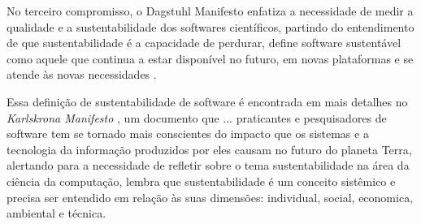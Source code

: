 
No terceiro compromisso, o Dagstuhl Manifesto enfatiza a necessidade de medir a
qualidade e a sustentabilidade dos softwares científicos, partindo do
entendimento de que sustentabilidade é a capacidade de perdurar, define software
sustentável como aquele que continua a estar disponível no futuro, em novas
plataformas e se atende às novas necessidades \cite{allen2017engineering}.


Essa definição de sustentabilidade de software é encontrada em mais detalhes no
{\it Karlskrona Manifesto} \cite{becker2014karlskrona}, um documento que ...
praticantes e pesquisadores de software tem se tornado mais conscientes do
impacto que os sistemas e a tecnologia da informação produzidos por eles causam
no futuro do planeta Terra, alertando para a necessidade de refletir sobre o
tema sustentabilidade na área da ciência da computação, lembra que
sustentabilidade é um conceito sistêmico e precisa ser entendido em relação às
suas dimensões: individual, social, economica, ambiental e técnica.

